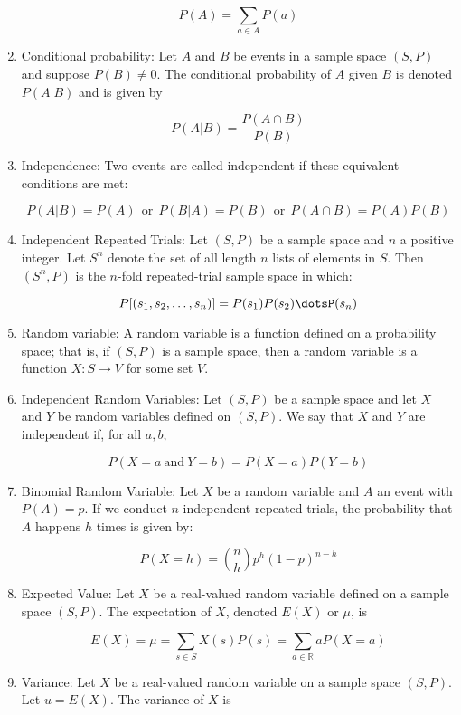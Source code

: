 \documentclass{article}
\begin{document}
\begin{enumerate}
    \[P(A)=\sum_{a\in A}P(a)\]
    
    \item Conditional probability: Let $A$ and $B$ be events in a sample space $(S,P)$ and suppose $P(B)\neq 0$.
    The conditional probability of $A$ given $B$ is denoted $P(A|B)$ and is given by
    
    \[P(A|B)=\frac{P(A\cap B)}{P(B)}\]
    
    \item Independence: Two events are called independent if these equivalent conditions are met: 
    
    \[P(A|B)=P(A)\:\: \text{or} \:\: P(B|A)=P(B) \:\: \text{or} \:\: P(A\cap B)=P(A)P(B)\]
    
    \item Independent Repeated Trials: Let $(S,P)$ be a sample space and $n$ a positive integer.
    Let $S^n$ denote the set of all length $n$ lists of elements in $S$.
    Then $(S^n,P)$ is the $n$-fold repeated-trial sample space in which:
    
    \[P[(s_1,s_2,\dots,s_n)]=P(s_1)P(s_2)\dotsP(s_n)\]
    
    \item Random variable: A random variable is a function defined on a probability space;
    that is, if $(S,P)$ is a sample space, then a random variable is a function $X:S\to V$ for some set $V$.
    
    \item Independent Random Variables: Let $(S,P)$ be a sample space and let $X$ and $Y$ be random variables defined on $(S,P)$.
    We say that $X$ and $Y$ are independent if, for all $a,b$,
    
    \[P(X=a\: \text{and} \: Y=b)=P(X=a)P(Y=b)\]
    
    \item Binomial Random Variable: Let $X$ be a random variable and $A$ an event with $P(A)=p$.
    If we conduct $n$ independent repeated trials, the probability that $A$ happens $h$ times is given by:
    
     \[P(X=h)= {n \choose h} p^h(1-p)^{n-h}\]
    
    \item Expected Value: Let $X$ be a real-valued random variable defined on a sample space $(S,P)$.
    The expectation of $X$, denoted $E(X)$ or $\mu$, is
    
    \[E(X)=\mu=\sum_{s\in S}X(s)P(s)=\sum_{a\in\mathbb{R}}aP(X=a)\]
    
    \item Variance: Let $X$ be a real-valued random variable on a sample space $(S,P)$.
    Let $u=E(X)$.
    The variance of $X$ is
    

\end{enumerate}
\end{document}
